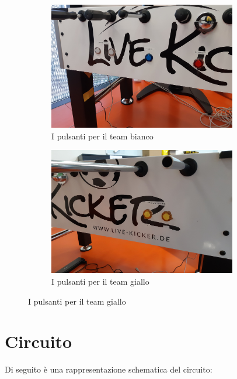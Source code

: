 \documentclass[12pt]{article}
\begin{document}
	\begin{figure}[H]
        \begin{subfigure}{0.5\textwidth}
                \includegraphics[width=0.9\textwidth]{img/btn_white.jpg}
                \caption*{I pulsanti per il team bianco}
        \end{subfigure}
        \begin{subfigure}{0.5\textwidth}
                \includegraphics[width=0.9\textwidth]{img/btn_yellow.jpg}
                \caption*{I pulsanti per il team giallo}
         \end{subfigure}
	\end{figure}
	
	
	
\section{Circuito}

	Di seguito è una rappresentazione schematica del circuito: 
	
\end{document}
